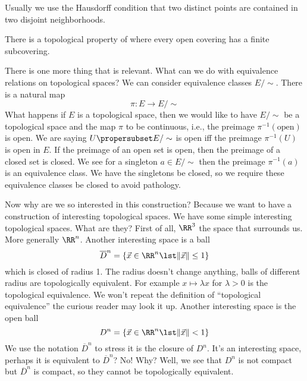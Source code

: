 Usually we use the Hausdorff condition that two distinct points
are contained in two disjoint neighborhoods.

There is a topological property of  where
every open covering has a finite subcovering.

There is one more thing that is relevant. What can we do with
equivalence relations on topological spaces? We can consider
equivalence classes $E/\sim$. There is a natural map
\begin{equation}
\pi\colon E\to E/\sim
\end{equation}
What happens if $E$ is a topological space, then we would like
to have $E/\sim$ be a topological space and the map $\pi$ to be
continuous, i.e., the preimage $\pi^{-1}(\mbox{open})$ is
open. We are saying $U\propersubset E/\sim$ is open iff the
preimage $\pi^{-1}(U)$ is open in $E$. If the preimage of an open
set is open, then the preimage of a closed set is closed. We see
for a singleton $a\in E/\sim$ then the preimage $\pi^{-1}(a)$ is
an equivalence class. We have the singletons be closed, so we
require these equivalence classes be closed to avoid pathology.

Now why are we so interested in this construction? Because we
want to have a construction of interesting topological spaces. We
have some simple interesting topological spaces. What are they?
First of all, $\RR^{3}$ the space that surrounds us. More
generally $\RR^{n}$. Another interesting space is a ball
\begin{equation}\index{$\bar{D}^{n}$}
\overline{D}^{n}=\{\vec{x}\in\RR^{n}\lst\|\vec{x}\|\leq1\}
\end{equation}
which is closed of radius 1. The radius doesn't change anything,
balls of different radius are topologically equivalent. For
example $x\mapsto\lambda x$ for $\lambda>0$ is the topological
equivalence. We won't repeat the definition of ``topological
equivalence'' the curious reader may look it up. Another
interesting space is the open ball
\begin{equation}
D^{n}=\{\vec{x}\in\RR^{n}\lst\|\vec{x}\|<1\}
\end{equation}
We use the notation $\overline{D}^{n}$ to stress it is the
closure of $D^{n}$. It's an interesting space, perhaps it is
equivalent to $\overline{D}^{n}$? No! Why? Well, we see that
$D^{n}$ is not compact but $\overline{D}^{n}$ is compact, so they
cannot be topologically equivalent.

